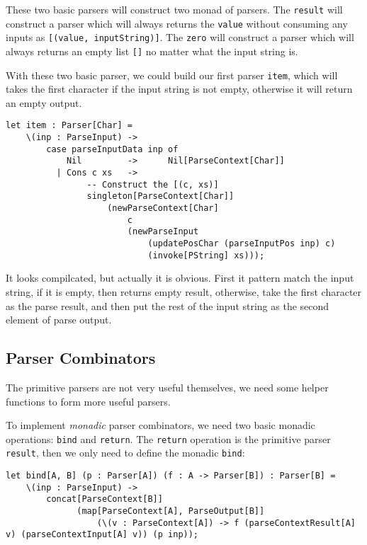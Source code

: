 These two basic parsers will construct two monad of parsers. The \texttt{result} will construct a parser which will always returns the \texttt{value} without consuming any inputs as \texttt{[(value, inputString)]}. The \texttt{zero} will construct a parser which will always returns an empty list \texttt{[]} no matter what the input string is.

With these two basic parser, we could build our first parser \texttt{item}, which will takes the first character if the input string is not empty, otherwise it will return an empty output.

\begin{lstlisting}
let item : Parser[Char] =
    \(inp : ParseInput) ->
        case parseInputData inp of
            Nil         ->      Nil[ParseContext[Char]]
          | Cons c xs   ->
                -- Construct the [(c, xs)]
                singleton[ParseContext[Char]]
                    (newParseContext[Char]
                        c
                        (newParseInput
                            (updatePosChar (parseInputPos inp) c)
                            (invoke[PString] xs)));
\end{lstlisting}

It looks compilcated, but actually it is obvious. First it pattern match the input string, if it is empty, then returns empty result, otherwise, take the first character as the parse result, and then put the rest of the input string as the second element of parse output.

\subsection{Parser Combinators}

The primitive parsers are not very useful themselves, we need some helper functions to form more useful parsers.

To implement \textit{monadic} parser combinators, we need two basic monadic operations: \texttt{bind} and \texttt{return}. The \texttt{return} operation is the primitive parser \texttt{result}, then we only need to define the monadic \texttt{bind}:

\begin{lstlisting}
let bind[A, B] (p : Parser[A]) (f : A -> Parser[B]) : Parser[B] =
    \(inp : ParseInput) ->
        concat[ParseContext[B]]
              (map[ParseContext[A], ParseOutput[B]]
                  (\(v : ParseContext[A]) -> f (parseContextResult[A] v) (parseContextInput[A] v)) (p inp));
\end{lstlisting}

